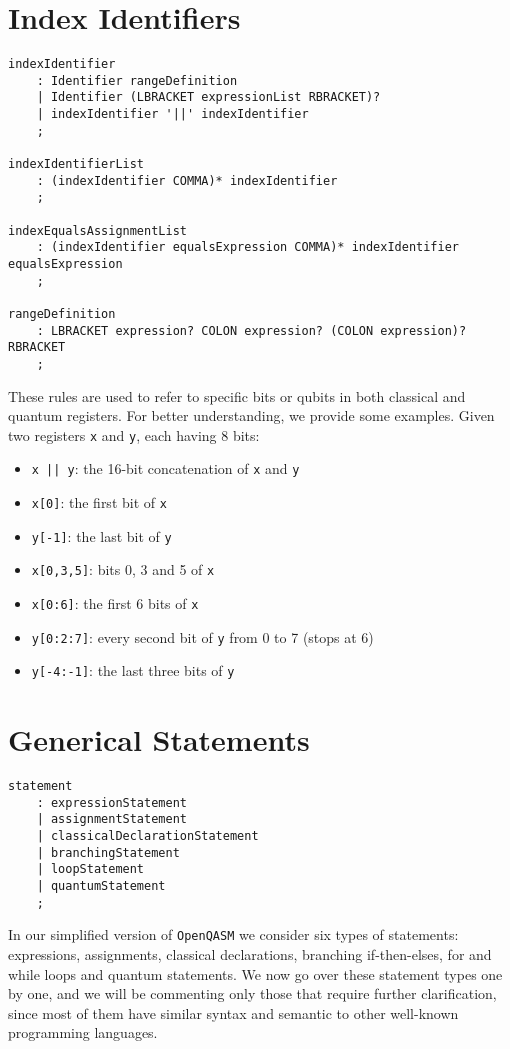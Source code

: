 \documentclass[12pt,a4paper]{report}
\theoremstyle{definition}
\theoremstyle{definition}
\theoremstyle{definition}
\begin{document}
\section{Index Identifiers}
\begin{lstlisting}
indexIdentifier
    : Identifier rangeDefinition
    | Identifier (LBRACKET expressionList RBRACKET)?
    | indexIdentifier '||' indexIdentifier
    ;

indexIdentifierList
    : (indexIdentifier COMMA)* indexIdentifier
    ;

indexEqualsAssignmentList
    : (indexIdentifier equalsExpression COMMA)* indexIdentifier equalsExpression
    ;

rangeDefinition
    : LBRACKET expression? COLON expression? (COLON expression)? RBRACKET
    ;
\end{lstlisting}
These rules are used to refer to specific bits or qubits in both classical and quantum registers. For better understanding, we provide some examples. Given two registers \texttt{x} and \texttt{y}, each having 8 bits:
\begin{itemize}
    \itemsep 0em
    \item \texttt{x || y}: the 16-bit concatenation of \texttt{x} and \texttt{y}
    \item \texttt{x[0]}: the first bit of \texttt{x}
    \item \texttt{y[-1]}: the last bit of \texttt{y}
    \item \texttt{x[0,3,5]}: bits 0, 3 and 5 of \texttt{x}
    \item \texttt{x[0:6]}: the first 6 bits of \texttt{x}
    \item \texttt{y[0:2:7]}: every second bit of \texttt{y} from 0 to 7 (stops at 6)
    \item \texttt{y[-4:-1]}: the last three bits of \texttt{y}
\end{itemize}



\section{Generical Statements}
\begin{lstlisting}
statement
    : expressionStatement
    | assignmentStatement
    | classicalDeclarationStatement
    | branchingStatement
    | loopStatement
    | quantumStatement
    ;
\end{lstlisting}

In our simplified version of \texttt{OpenQASM} we consider six types of statements: expressions, assignments, classical declarations, branching if-then-elses, for and while loops and quantum statements. We now go over these statement types one by one, and we will be commenting only those that require further clarification, since most of them have similar syntax and semantic to other well-known programming languages.\\
\end{document}
